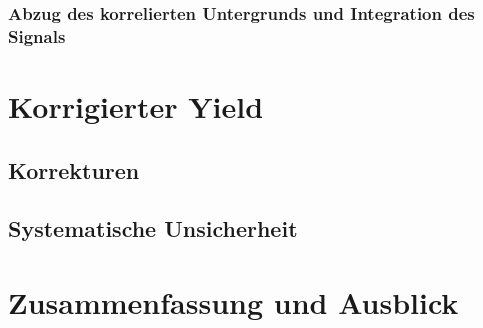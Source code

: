 \documentclass[11pt]{article}
\begin{document}
\subsubsection{Abzug des korrelierten Untergrunds und Integration des Signals} \label{s3s5s4}

\section{Korrigierter Yield} \label{s4}

\subsection{Korrekturen} \label{s4s1}

\subsection{Systematische Unsicherheit} \label{s4s2}

\section{Zusammenfassung und Ausblick} \label{s5}
\end{document}

